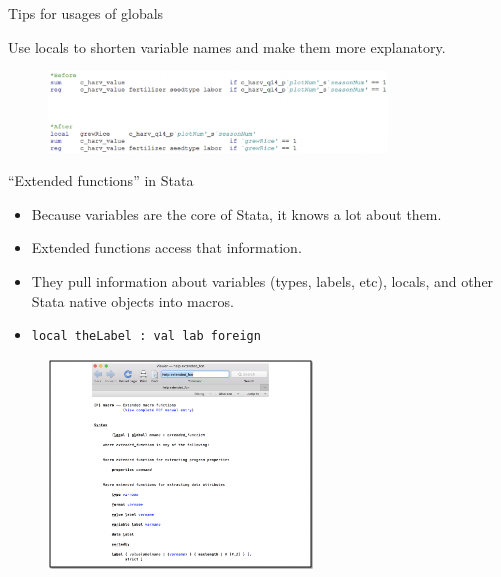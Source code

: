 \documentclass[aspectratio=169]{beamer}
\begin{document}
\begin{frame}{Tips for usages of globals}

Use locals to shorten variable names and make them more explanatory.

	\begin{figure}
	\centering
	\includegraphics[width=90mm]{img/Tips}
\end{figure}

\end{frame}


\begin{frame}[fragile]{“Extended functions” in Stata}
\begin{multicols}{2}	
	
	\begin{itemize}[<default overlay specification>]
		\item<1>  Because variables are the core of Stata, it knows a lot about them.
		\item<1>  Extended functions access that information.
		\item<1> They pull information about variables (types, labels, etc), locals, and other Stata native objects into macros.
		\item<1>  \texttt{local theLabel : val lab foreign}
	\end{itemize}
	
	\begin{figure}
		\centering
		\includegraphics[width=70mm, right]{img/Tips2}
	\end{figure}
	
\end{multicols}
\end{frame}
\end{document}
